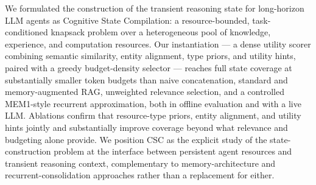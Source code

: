 \documentclass{article}
\begin{document}
We formulated the construction of the transient reasoning state for long-horizon LLM agents as Cognitive State Compilation: a resource-bounded, task-conditioned knapsack problem over a heterogeneous pool of knowledge, experience, and computation resources. Our instantiation --- a dense utility scorer combining semantic similarity, entity alignment, type priors, and utility hints, paired with a greedy budget-density selector --- reaches full state coverage at substantially smaller token budgets than naive concatenation, standard and memory-augmented RAG, unweighted relevance selection, and a controlled MEM1-style recurrent approximation, both in offline evaluation and with a live LLM. Ablations confirm that resource-type priors, entity alignment, and utility hints jointly and substantially improve coverage beyond what relevance and budgeting alone provide. We position CSC as the explicit study of the state-construction problem at the interface between persistent agent resources and transient reasoning context, complementary to memory-architecture and recurrent-consolidation approaches rather than a replacement for either.



\end{document}
